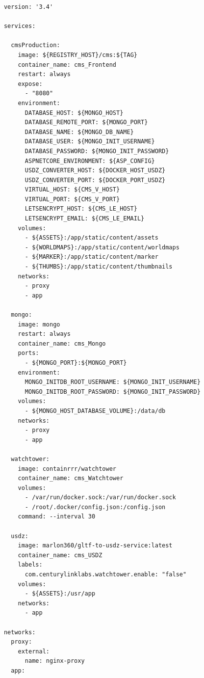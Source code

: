 \documentclass[titlepage, a4paper, 11pt]{scrartcl}
\begin{document}
          \begin{lstlisting}          
            version: '3.4'

            services:
            
              cmsProduction:
                image: ${REGISTRY_HOST}/cms:${TAG}
                container_name: cms_Frontend
                restart: always
                expose:
                  - "8080"
                environment:
                  DATABASE_HOST: ${MONGO_HOST}
                  DATABASE_REMOTE_PORT: ${MONGO_PORT}
                  DATABASE_NAME: ${MONGO_DB_NAME}
                  DATABASE_USER: ${MONGO_INIT_USERNAME}
                  DATABASE_PASSWORD: ${MONGO_INIT_PASSWORD}
                  ASPNETCORE_ENVIRONMENT: ${ASP_CONFIG}
                  USDZ_CONVERTER_HOST: ${DOCKER_HOST_USDZ}
                  USDZ_CONVERTER_PORT: ${DOCKER_PORT_USDZ}
                  VIRTUAL_HOST: ${CMS_V_HOST}
                  VIRTUAL_PORT: ${CMS_V_PORT}
                  LETSENCRYPT_HOST: ${CMS_LE_HOST}
                  LETSENCRYPT_EMAIL: ${CMS_LE_EMAIL}
                volumes:
                  - ${ASSETS}:/app/static/content/assets
                  - ${WORLDMAPS}:/app/static/content/worldmaps
                  - ${MARKER}:/app/static/content/marker
                  - ${THUMBS}:/app/static/content/thumbnails
                networks:
                  - proxy
                  - app
            
              mongo:
                image: mongo
                restart: always
                container_name: cms_Mongo
                ports:
                  - ${MONGO_PORT}:${MONGO_PORT}
                environment:
                  MONGO_INITDB_ROOT_USERNAME: ${MONGO_INIT_USERNAME}
                  MONGO_INITDB_ROOT_PASSWORD: ${MONGO_INIT_PASSWORD}
                volumes:
                  - ${MONGO_HOST_DATABASE_VOLUME}:/data/db
                networks:
                  - proxy
                  - app
                  
              watchtower:
                image: containrrr/watchtower
                container_name: cms_Watchtower
                volumes:
                  - /var/run/docker.sock:/var/run/docker.sock
                  - /root/.docker/config.json:/config.json
                command: --interval 30
                
              usdz:
                image: marlon360/gltf-to-usdz-service:latest
                container_name: cms_USDZ
                labels:
                  com.centurylinklabs.watchtower.enable: "false"
                volumes:
                  - ${ASSETS}:/usr/app
                networks:
                  - app
            
            networks:
              proxy:
                external:
                  name: nginx-proxy
              app:
            
          \end{lstlisting}
\end{document}
